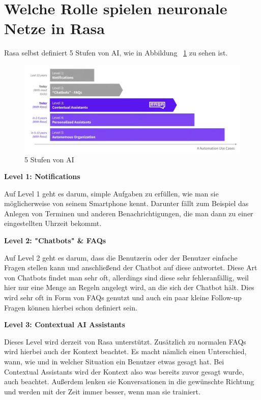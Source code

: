 \section{Welche Rolle spielen neuronale Netze in Rasa}\label{sec:neural-networks}

Rasa selbst definiert 5 Stufen von AI, wie in Abbildung ~\ref{fig:5_levels_of_ai} zu sehen ist\@.\cite{ai5Levels}

\begin{figure}[hbt!]
    \centering
    \includegraphics[scale=0.25]{pics/5_levels_of_ai}
    \caption{5 Stufen von AI~\cite{ai5LevelsVideo}}
    \label{fig:5_levels_of_ai}
\end{figure}

\textbf{Level 1: Notifications}

Auf Level 1 geht es darum, simple Aufgaben zu erfüllen, wie man sie möglicherweise von seinem Smartphone kennt.
Darunter fällt zum Beispiel das Anlegen von Terminen und anderen Benachrichtigungen, die man dann zu einer eingestellten Uhrzeit bekommt.\cite{rasaMasterclass5Levels,ai5Levels,ai5LevelsVideo}

\textbf{Level 2: "Chatbots" \& FAQs}

Auf Level 2 geht es darum, dass die Benutzerin oder der Benutzer einfache Fragen stellen kann und anschließend der Chatbot auf diese antwortet.
Diese Art von Chatbots findet man sehr oft, allerdings sind diese sehr fehleranfällig, weil hier nur eine Menge an Regeln angelegt wird, an die sich der Chatbot hält.
Dies wird sehr oft in Form von FAQs genutzt und auch ein paar kleine Follow-up Fragen können hierbei schon definiert sein.\cite{rasaMasterclass5Levels,ai5Levels,ai5LevelsVideo}

\textbf{Level 3: Contextual AI Assistants}

Dieses Level wird derzeit von Rasa unterstützt.
Zusätzlich zu normalen FAQs wird hierbei auch der Kontext beachtet.
Es macht nämlich einen Unterschied, wann, wie und in welcher Situation ein Benutzer etwas gesagt hat.
Bei Contextual Assistants wird der Kontext also was bereits zuvor gesagt wurde, auch beachtet.
Außerdem lenken sie Konversationen in die gewünschte Richtung und werden mit der Zeit immer besser, wenn man sie trainiert.\cite{rasaMasterclass5Levels,ai5Levels,ai5LevelsVideo}


